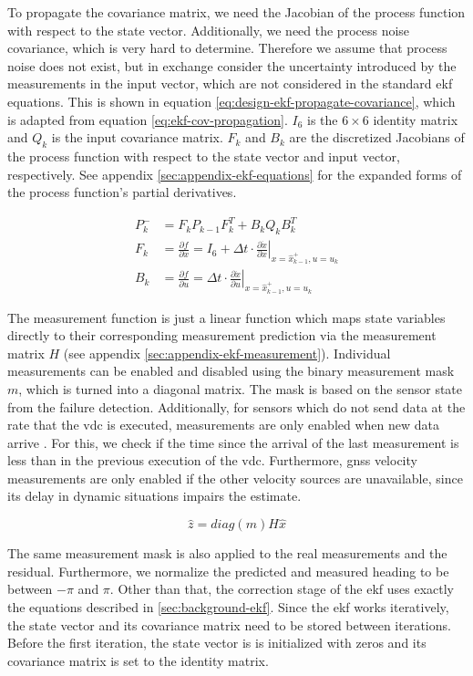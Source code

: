 To propagate the covariance matrix, we need the Jacobian of the process function with respect to the state vector. Additionally, we need the process noise covariance, which is very hard to determine. Therefore we assume that process noise does not exist, but in exchange consider the uncertainty introduced by the measurements in the input vector, which are not considered in the standard \gls{ekf} equations. This is shown in equation \ref{eq:design-ekf-propagate-covariance}, which is adapted from equation \ref{eq:ekf-cov-propagation}. $I_6$ is the $6 \times 6$ identity matrix and $Q_k$ is the input covariance matrix. $F_k$ and $B_k$ are the discretized Jacobians of the process function with respect to the state vector and input vector, respectively. See appendix \ref{sec:appendix-ekf-equations} for the expanded forms of the process function's partial derivatives.

\begin{subequations}\label{eq:design-ekf-propagate-covariance}
\begin{alignat}{2}%
P_k^- &= F_k P_{k-1} F_k^T + B_k Q_k B_k^T \\%
F_k &= \frac{\partial f}{\partial x} = I_6 + \Delta t \cdot \left. \frac{\partial \dot{x}}{\partial x} \right|_{x = \hat{x}_{k-1}^+, u=u_k} \\%
B_k &= \frac{\partial f}{\partial u} = \Delta t \cdot \left. \frac{\partial \dot{x}}{\partial u} \right|_{x = \hat{x}_{k-1}^+, u=u_k}
\end{alignat}
\end{subequations}


The measurement function is just a linear function which maps state variables directly to their corresponding measurement prediction via the measurement matrix $H$ (see appendix \ref{sec:appendix-ekf-measurement}). Individual measurements can be enabled and disabled using the binary measurement mask $m$, which is turned into a diagonal matrix. The mask is based on the sensor state from the failure detection. Additionally, for sensors which do not send data at the rate that the \gls{vdc} is executed, measurements are only enabled when new data arrive
. For this, we check if the time since the arrival of the last measurement is less than in the previous execution of the \gls{vdc}. Furthermore, \gls{gnss} velocity measurements are only enabled if the other velocity sources are unavailable, since its delay in dynamic situations impairs the estimate.

\begin{equation}
\hat{z} = \textit{diag}(m) H \hat{x}
\end{equation}

The same measurement mask is also applied to the real measurements and the residual. Furthermore, we normalize the predicted and measured heading to be between $-\pi$ and $\pi$. Other than that, the correction stage of the \gls{ekf} uses exactly the equations described in \ref{sec:background-ekf}. Since the \gls{ekf} works iteratively, the state vector and its covariance matrix need to be stored between iterations. Before the first iteration, the state vector is is initialized with zeros and its covariance matrix is set to the identity matrix.

